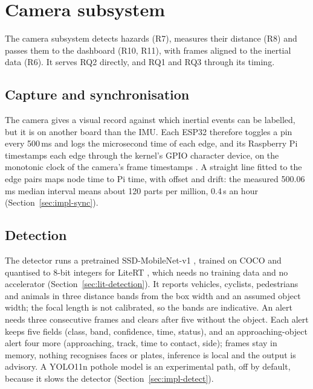 \section{Camera subsystem}
\label{sec:camera-subsystem}

The camera subsystem detects hazards (R7), measures their distance (R8) and passes them to the dashboard (R10, R11), with frames aligned to the inertial data (R6). It serves RQ2 directly, and RQ1 and RQ3 through its timing.

\subsection{Capture and synchronisation}
\label{sec:sync-pulse}

The camera gives a visual record against which inertial events can be labelled, but it is on another board than the IMU. Each ESP32 therefore toggles a pin every 500\,ms and logs the microsecond time of each edge, and its Raspberry Pi timestamps each edge through the kernel's GPIO character device, on the monotonic clock of the camera's frame timestamps \cite{picamera2manual}. A straight line fitted to the edge pairs maps node time to Pi time, with offset and drift: the measured 500.06\,ms median interval means about 120 parts per million, 0.4\,s an hour (Section~\ref{sec:impl-sync}).

\subsection{Detection}
\label{sec:hazard-detection}

The detector runs a pretrained SSD-MobileNet-v1 \cite{liu2016ssd, howard2017mobilenets}, trained on COCO \cite{lin2014coco} and quantised to 8-bit integers \cite{jacob2018quantization} for LiteRT \cite{litert}, which needs no training data and no accelerator (Section~\ref{sec:lit-detection}). It reports vehicles, cyclists, pedestrians and animals in three distance bands from the box width and an assumed object width; the focal length is not calibrated, so the bands are indicative. An alert needs three consecutive frames and clears after five without the object. Each alert keeps five fields (class, band, confidence, time, status), and an approaching-object alert four more (approaching, track, time to contact, side); frames stay in memory, nothing recognises faces or plates, inference is local and the output is advisory. A YOLO11n pothole model \cite{ultralytics2024yolo11, gerapothole, nienaber2015dataset} is an experimental path, off by default, because it slows the detector \cite{ncnn} (Section~\ref{sec:impl-detect}).

